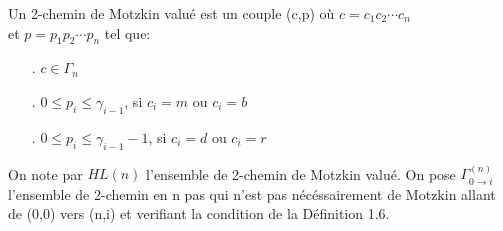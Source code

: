		\begin{definition}
			\begin{rm}
			Un 2-chemin de Motzkin valué est un couple (c,p) où $c = c_{1}c_{2}\cdots c_{n}$\\ et $p = p_{1}p_{2}\cdots p_{n}$ tel que: 
				\begin{itemize} 
					\item[.] $c \in \Gamma_{n}$
					\item[.] $0\leq p_{i}\leq \gamma_{i-1}$, si $c_{i}=m\text{ ou }c_{i}=b$
					\item[.]  $0\leq p_{i}\leq \gamma_{i-1} - 1$, si  $c_{i}=d\text{ ou }c_{i}=r$
				\end{itemize}
			\end{rm}
		\end{definition}
		On note par $HL(n)$ l'ensemble de 2-chemin de Motzkin valué. On pose $\Gamma^{(n)}_{0 \to i}$ l'ensemble de 2-chemin en n pas qui n'est pas nécéssairement de Motzkin allant de (0,0) vers (n,i) et verifiant la condition de la Définition 1.6. 

